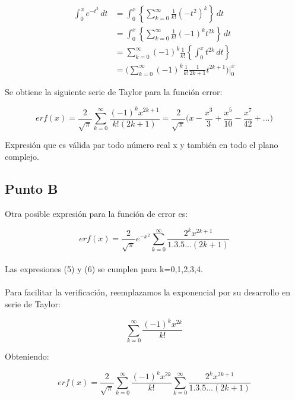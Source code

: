 \documentclass[a4paper]{article}
\begin{document}
\begin{align*}
\int_0^x e^{-t^2}\,dt
&=
\int_0^x
\left\{
\sum_{k=0}^\infty \frac{1}{k!}\left(-t^2\right)^{k}
\right\}\,dt \\
&=
\int_0^x
\left\{
\sum_{k=0}^\infty
\frac{1}{k!}(-1)^kt^{2k}
\right\}\,dt
\\
&=
\sum_{k=0}^\infty(-1)^k\frac{1}{k!}
\left\{
\int_0^x t^{2k}\,dt
\right\} \\
&=
\bigg(\sum_{k=0}^\infty
(-1)^k\frac{1}{k!}\frac{1}{2k+1}t^{2k+1}\bigg)\bigg|_0^x
\end{align*}

Se obtiene la siguiente serie de Taylor para la función error:

\begin{equation}
erf(x)=\frac{2}{\sqrt{\pi}}\sum_{k=0}^\infty
\frac{(-1)^k x^{2k+1}}{k! (2k+1)} = \frac{2}{\sqrt{\pi}}
\bigg(x-\frac{x^{3}}{3}+\frac{x^{5}}{10}-\frac{x^{7}}{42}+...\bigg)
\end{equation}

Expresión que es válida par todo número real x y también en todo el plano complejo.

\subsection{Punto B}
Otra posible expresión para la función de error es:

\begin{equation}
erf(x)=\frac{2}{\sqrt{\pi}}e^{-x^{2}}\sum_{k=0}^\infty
\frac{2^k x^{2k+1}}{1.3.5 ... (2k+1)}
\end{equation}\\

Las expresiones (5) y (6) se cumplen para k=0,1,2,3,4.\\ \\
Para facilitar la verificación, reemplazamos la exponencial por su desarrollo en serie de Taylor:

\begin{equation}
\sum_{k=0}^\infty
\frac{(-1)^k x^{2k}}{k!}
\end{equation}

Obteniendo:

\begin{equation}
erf(x)=\frac{2}{\sqrt{\pi}}\sum_{k=0}^\infty
\frac{(-1)^k x^{2k}}{k!}\sum_{k=0}^\infty
\frac{2^k x^{2k+1}}{1.3.5 ... (2k+1)}
\end{equation}\\ \\
\end{document}
